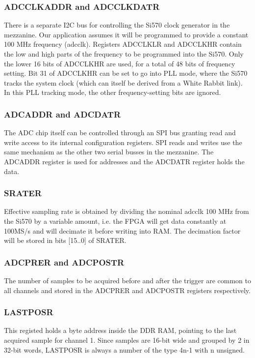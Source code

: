 \documentclass[a4paper]{article}
\begin{document}
\subsubsection{ADCCLKADDR and ADCCLKDATR}
\label{ss:adcclk}
There is a separate I2C bus for controlling the Si570 clock generator in the mezzanine. Our application assumes it will be programmed to provide a constant 100 MHz frequency (adcclk). Registers ADCCLKLR and ADCCLKHR contain the low and high parts of the frequency to be programmed into the Si570. Only the lower 16 bits of ADCCLKHR are used, for a total of 48 bits of frequency setting. Bit 31 of ADCCLKHR can be set to go into PLL mode, where the Si570 tracks the system clock (which can itself be derived from a White Rabbit link). In this PLL tracking mode, the other frequency-setting bits are ignored.

\subsubsection{ADCADDR and ADCDATR}
The ADC chip itself can be controlled through an SPI bus granting read and write access to its internal configuration registers. SPI reads and writes use the same mechanism as the other two serial busses in the mezzanine. The ADCADDR register is used for addresses and the ADCDATR register holds the data.

\subsubsection{SRATER}
Effective sampling rate is obtained by dividing the nominal adcclk 100 MHz from the Si570 by a variable amount, i.e. the FPGA will get data constantly at 100MS/s and will decimate it before writing into RAM. The decimation factor will be stored in bits [15..0] of SRATER.

\subsubsection{ADCPRER and ADCPOSTR}
The number of samples to be acquired before and after the trigger are common to all channels and stored in the ADCPRER and ADCPOSTR registers respectively.

\subsubsection{LASTPOSR}
This registed holds a byte address inside the DDR RAM, pointing to the last acquired sample for channel 1. Since samples are 16-bit wide and grouped by 2 in 32-bit words, LASTPOSR is always a number of the type 4n-1 with n unsigned.
\end{document}

